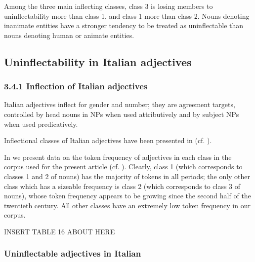 \documentclass[output=paper]{langscibook}
\begin{document}
Among the three main inflecting classes, class 3 is losing members to uninflectability more than class 1, and class 1 more than class 2. Nouns denoting inanimate entities have a stronger tendency to be treated as uninflectable than nouns denoting human or animate entities.

\subsection{Uninflectability in Italian adjectives}
\subsubsection{3.4.1  Inflection of Italian adjectives}

Italian adjectives inflect for gender and number; they are agreement targets, controlled by head nouns in NPs when used attributively and by subject NPs when used predicatively.

Inflectional classes of Italian adjectives have been presented in  (cf. ).

In  we present data on the token frequency of adjectives in each class in the corpus used for the present article (cf. ). Clearly, class 1 (which corresponds to classes 1 and 2 of nouns) has the majority of tokens in all periods; the only other class which has a sizeable frequency is class 2 (which corresponds to class 3 of nouns), whose token frequency appears to be growing since the second half of the twentieth century. All other classes have an extremely low token frequency in our corpus. 

INSERT TABLE 16 ABOUT HERE

\subsubsection{Uninflectable adjectives in Italian}
\end{document}
